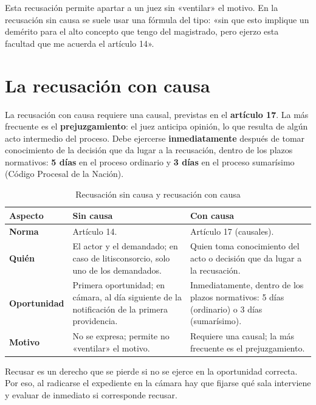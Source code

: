 \documentclass[12pt,oneside]{book}
\begin{document}
Esta recusación permite apartar a un juez sin «ventilar» el motivo. En la recusación sin causa se suele usar una fórmula del tipo: «sin que esto implique un demérito para el alto concepto que tengo del magistrado, pero ejerzo esta facultad que me acuerda el artículo 14».

\section{La recusación con causa}

La recusación con causa requiere una causal, previstas en el \textbf{artículo 17}. La más frecuente es el \textbf{prejuzgamiento}: el juez anticipa opinión, lo que resulta de algún acto intermedio del proceso. Debe ejercerse \textbf{inmediatamente} después de tomar conocimiento de la decisión que da lugar a la recusación, dentro de los plazos normativos: \textbf{5 días} en el proceso ordinario y \textbf{3 días} en el proceso sumarísimo (Código Procesal de la Nación).

\begin{table}[H]
\centering
\caption{Recusación sin causa y recusación con causa}
\small
\begin{tabularx}{\textwidth}{>{\raggedright\arraybackslash}p{2.8cm} Y Y}
\toprule
\textbf{Aspecto} & \textbf{Sin causa} & \textbf{Con causa} \\
\midrule
\textbf{Norma} & Artículo 14. & Artículo 17 (causales). \\
\textbf{Quién} & El actor y el demandado; en caso de litisconsorcio, solo uno de los demandados. & Quien toma conocimiento del acto o decisión que da lugar a la recusación. \\
\textbf{Oportunidad} & Primera oportunidad; en cámara, al día siguiente de la notificación de la primera providencia. & Inmediatamente, dentro de los plazos normativos: 5 días (ordinario) o 3 días (sumarísimo). \\
\textbf{Motivo} & No se expresa; permite no «ventilar» el motivo. & Requiere una causal; la más frecuente es el prejuzgamiento. \\
\bottomrule
\end{tabularx}
\end{table}

\begin{important}
Recusar es un derecho que se pierde si no se ejerce en la oportunidad correcta. Por eso, al radicarse el expediente en la cámara hay que fijarse qué sala interviene y evaluar de inmediato si corresponde recusar.
\end{important}
\end{document}

